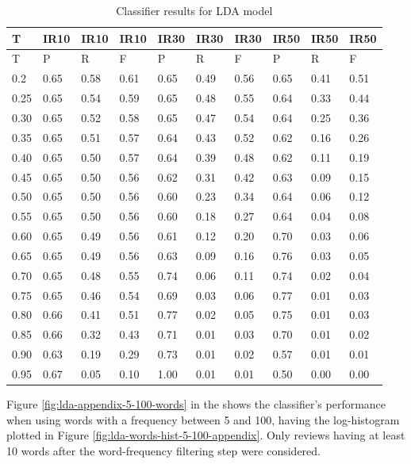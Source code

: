 \begin{center}
\begin{table}[!h]
\centering
\begin{tabular}{|l|l|l|l|l|l|l|l|l|l|}
  \hline
T & IR10 & IR10 & IR10 & IR30 & IR30 & IR30 & IR50 & IR50 & IR50 \\ 
  \hline
T & P & R & F & P & R & F & P & R & F \\ 
   \hline
0.2 & 0.65 & 0.58 & 0.61 & 0.65 & 0.49 & 0.56 & 0.65 & 0.41 & 0.51 \\ 
  0.25 & 0.65 & 0.54 & 0.59 & 0.65 & 0.48 & 0.55 & 0.64 & 0.33 & 0.44 \\ 
  0.30 & 0.65 & 0.52 & 0.58 & 0.65 & 0.47 & 0.54 & 0.64 & 0.25 & 0.36 \\ 
  0.35 & 0.65 & 0.51 & 0.57 & 0.64 & 0.43 & 0.52 & 0.62 & 0.16 & 0.26 \\ 
  0.40 & 0.65 & 0.50 & 0.57 & 0.64 & 0.39 & 0.48 & 0.62 & 0.11 & 0.19 \\ 
  0.45 & 0.65 & 0.50 & 0.56 & 0.62 & 0.31 & 0.42 & 0.63 & 0.09 & 0.15 \\ 
  0.50 & 0.65 & 0.50 & 0.56 & 0.60 & 0.23 & 0.34 & 0.64 & 0.06 & 0.12 \\ 
  0.55 & 0.65 & 0.50 & 0.56 & 0.60 & 0.18 & 0.27 & 0.64 & 0.04 & 0.08 \\ 
  0.60 & 0.65 & 0.49 & 0.56 & 0.61 & 0.12 & 0.20 & 0.70 & 0.03 & 0.06 \\ 
  0.65 & 0.65 & 0.49 & 0.56 & 0.63 & 0.09 & 0.16 & 0.76 & 0.03 & 0.05 \\ 
   \rowcolor[gray]{.7} 0.70 & 0.65 & 0.48 & 0.55 & 0.74 & 0.06 & 0.11 & 0.74 & 0.02 & 0.04 \\ 
  0.75 & 0.65 & 0.46 & 0.54 & 0.69 & 0.03 & 0.06 & 0.77 & 0.01 & 0.03 \\ 
   \rowcolor[gray]{.7} 0.80 & 0.66 & 0.41 & 0.51 & 0.77 & 0.02 & 0.05 & 0.75 & 0.01 & 0.03 \\ 
  0.85 & 0.66 & 0.32 & 0.43 & 0.71 & 0.01 & 0.03 & 0.70 & 0.01 & 0.02 \\ 
  0.90 & 0.63 & 0.19 & 0.29 & 0.73 & 0.01 & 0.02 & 0.57 & 0.01 & 0.01 \\ 
  0.95 & 0.67 & 0.05 & 0.10 & 1.00 & 0.01 & 0.01 & 0.50 & 0.00 & 0.00 \\ 
   \hline
\end{tabular}
\caption{Classifier results for LDA model} 
\label{tab:lda}
\end{table}\end{center}

Figure \ref{fig:lda-appendix-5-100-words} in the  shows the classifier's performance when using words with a frequency between 5 and 100, having the log-histogram plotted in Figure \ref{fig:lda-words-hist-5-100-appendix}. Only reviews having at least 10 words after the word-frequency filtering step were considered. 

